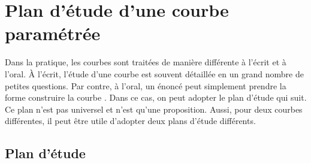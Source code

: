 \documentclass[class=report,crop=false]{standalone}
\begin{document}
\section{Plan d'étude d'une courbe paramétrée}


Dans la pratique, les courbes sont traitées de manière différente
à l'écrit et à l'oral. À l'écrit, l'étude d'une courbe est souvent
détaillée en un grand nombre de petites questions. Par contre,
à l'oral, un énoncé peut simplement prendre la forme
\og construire la courbe \fg.
Dans ce cas, on peut adopter le plan d'étude qui suit. Ce plan
n'est pas universel et n'est qu'une proposition. Aussi, pour
deux courbes  différentes, il peut être utile d'adopter
deux plans d'étude différents.

\subsection{Plan d'étude}
\end{document}
